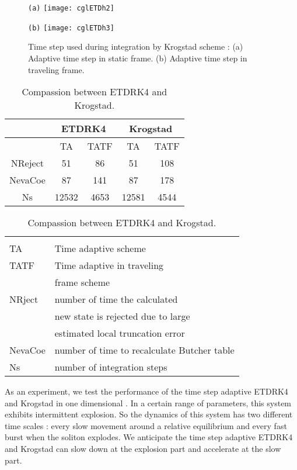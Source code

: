 \begin{figure}[h]
  \centering
  \begin{minipage}{.4\textwidth}
    \centering \small{\texttt{(a)}}
    \texttt{[image: cglETDh2]}
  \end{minipage}
  \begin{minipage}{.4\textwidth}
    \centering \small{\texttt{(b)}}
    \texttt{[image: cglETDh3]}
  \end{minipage}%
  \caption{ Time step used during integration by Krogstad scheme :
    (a) Adaptive time step in static frame.
    (b) Adaptive time step in traveling frame.
  }
  \label{fig:cglETDh}
\end{figure}

\begin{table}[h]
  \centering
  \begin{tabular}{c  c c  c c}
    & \multicolumn{2}{c}{ETDRK4} & \multicolumn{2}{c}{Krogstad} \\
    \hline
    &  TA & TATF & TA & TATF \\
    NReject &  51 & 86 & 51 & 108 \\
    NevaCoe &  87 & 141 & 87 & 178 \\
    Ns & 12532 & 4653 & 12581 &  4544 \\
    \hline
  \end{tabular}
  \begin{tabular}{l l }
    & \\
    TA  &  Time adaptive scheme \\
    TATF &  Time adaptive in traveling \\
         & frame scheme \\
    NRject &  number of time the calculated \\
           &  new state is rejected due to large \\
           &  estimated local truncation error  \\
    NevaCoe &  number of time to recalculate Butcher table \\
    Ns & number of integration steps \\
  \end{tabular}
  \caption{
    Compassion between ETDRK4 and Krogstad.
  }
  \label{tab:ETDKrog}
\end{table}

As an experiment, we test the performance of the time step adaptive ETDRK4 and
Krogstad in one dimensional \cqcGLe.
In a certain range of parameters, this system exhibits intermittent
explosion. So the dynamics of this system has two different time scales :
every slow movement around a relative equilibrium  and
every fast burst when the soliton explodes. We anticipate the time step adaptive
ETDRK4 and Krogstad can slow down at the explosion part and accelerate at the
slow part.

